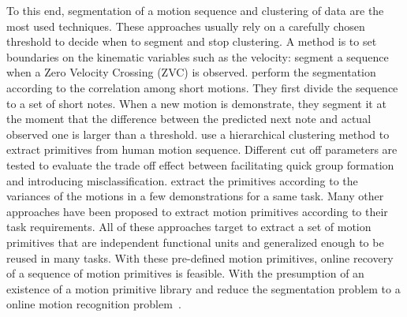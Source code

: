 To this end, segmentation of a motion sequence \citep{takano2006humanoid,Pais2013ID879} and clustering of data \citep{kulic2009online,kulic2012incremental} are the most used techniques. These approaches usually rely on a carefully chosen threshold to decide when to segment and stop clustering. A method is to set boundaries on the kinematic variables such as the velocity: \citet{fod2002automated} segment a sequence when a Zero Velocity Crossing (ZVC) is observed. \citet{takano2006humanoid} perform the segmentation according to the correlation among short motions. They first divide the sequence to a set of short notes. When a new motion is demonstrate, they segment it at the moment that the difference between the predicted next note and actual observed one is larger than a threshold. \citet{kulic2008incremental} use a hierarchical clustering method to extract primitives from human motion sequence. Different cut off parameters are tested to evaluate the trade off effect between facilitating quick group formation and introducing misclassification. \citet{Pais2013ID879} extract the primitives according to the variances of the motions in a few demonstrations for a same task. Many other approaches have been proposed to extract motion primitives according to their task requirements. All of these approaches target to extract a set of motion primitives that are independent functional units and generalized enough to be reused in many tasks. With these pre-defined motion primitives, online recovery of a sequence of motion primitives is feasible. With the presumption of an existence of a motion primitive library and reduce the segmentation problem to a online motion recognition problem~\citet{meier2011movement}.

